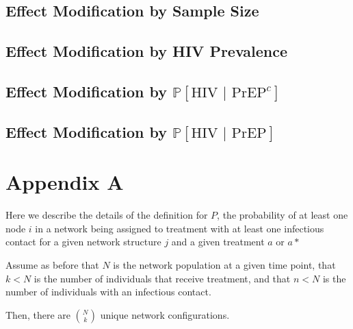 \documentclass{article}
\theoremstyle{definition}
\begin{document}
\subsection{Effect Modification by Sample Size}
\subsection{Effect Modification by HIV Prevalence}
\subsection{Effect Modification by $\mathbb{P}\left[\text{HIV } \vert \text{ PrEP}^{c}\right]$}
\subsection{Effect Modification by $\mathbb{P}\left[\text{HIV } \vert \text{ PrEP}\right]$}

\section{Appendix A}
Here we describe the details of the definition for $P$, the probability of at least one node $i$ in a network being assigned to treatment with at least one infectious contact for a given network structure $j$ and a given treatment $a$ or $a*$

Assume as before that $N$ is the network population at a given time point, that $k<N$ is the number of individuals that receive treatment, and that $n<N$ is the number of individuals with an infectious contact.

 Then, there are $N \choose k$ unique network configurations.
 
\end{document}
